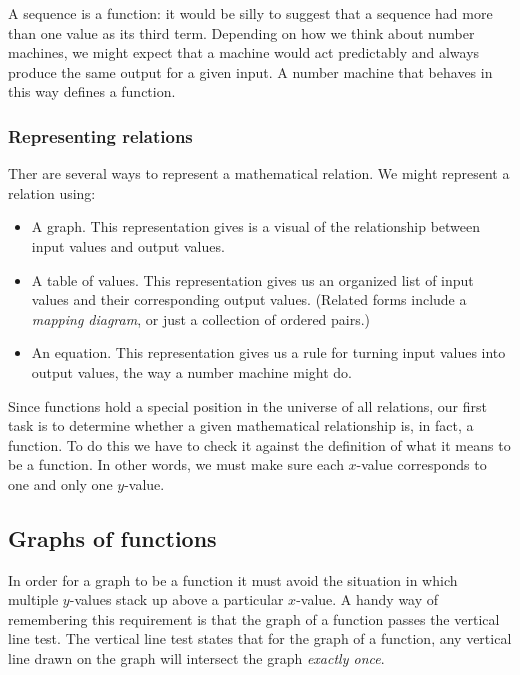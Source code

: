 A sequence is a function: it would be silly to suggest that a sequence had more than one value as its third term. Depending on how we think about number machines, we might expect that a machine would act predictably and always produce the same output for a given input. A number machine that behaves in this way defines a function.

\subsubsection{Representing relations}

Ther are several ways to represent a mathematical relation. We might represent a relation using:
\begin{itemize}
\item A graph. This representation gives is a visual of the relationship between input values and output values.
\item A table of values. This representation gives us an organized list of input values and their corresponding output values. (Related forms include a \textit{mapping diagram}, or just a collection of ordered pairs.)
\item An equation. This representation gives us a rule for turning input values into output values, the way a number machine might do.
\end{itemize}

Since functions hold a special position in the universe of all relations, our first task is to determine whether a given mathematical relationship is, in fact, a function. To do this we have to check it against the definition of what it means to be a function. In other words, we must make sure each $x$-value corresponds to one and only one $y$-value.


\subsection{Graphs of functions}

In order for a graph to be a function it must avoid the situation in which multiple $y$-values stack up above a particular $x$-value. A handy way of remembering this requirement is that the graph of a function passes the \gls{vertical line test}. The vertical line test states that for the graph of a function, any vertical line drawn on the graph will intersect the graph \textit{exactly once}.

